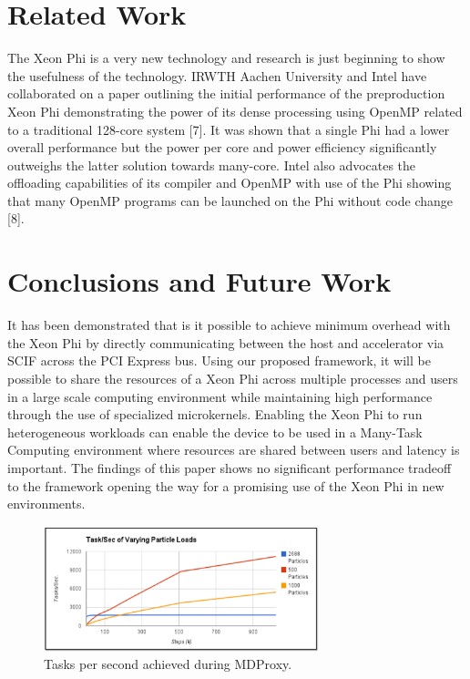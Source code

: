 \documentclass[conference]{IEEEtran}
\begin{document}
\section{Related Work}
The Xeon Phi is a very new technology and research is just beginning to show the usefulness of the technology. IRWTH Aachen University and Intel have collaborated on a paper outlining the initial performance of the preproduction Xeon Phi demonstrating the power of its dense processing using OpenMP related to a traditional 128-core system [7]. It was shown that a single Phi had a lower overall performance but the power per core and power efficiency significantly outweighs the latter solution towards many-core. Intel also advocates the offloading capabilities of its compiler and OpenMP with use of the Phi showing that many OpenMP programs can be launched on the Phi without code change [8].

\section{Conclusions and Future Work}
It has been demonstrated that is it possible to achieve minimum overhead with the Xeon Phi by directly communicating between the host and accelerator via SCIF across the PCI Express bus. Using our proposed framework, it will be possible to share the resources of a Xeon Phi across multiple processes and users in a large scale computing environment while maintaining high performance through the use of specialized microkernels. Enabling the Xeon Phi to run heterogeneous workloads can enable the device to be used in a Many-Task Computing \cite{raicu2008toward} environment where resources are shared between users and latency is important. The findings of this paper shows no significant performance tradeoff to the framework opening the way for a promising use of the Xeon Phi in new environments.

\begin{figure}[h]
\centering\includegraphics[width=8cm]{imgs/tasks_per_sec.png}
\caption{Tasks per second achieved during MDProxy.}
\label{fig:tasks_per_sec}
\end{figure}



\end{document}
